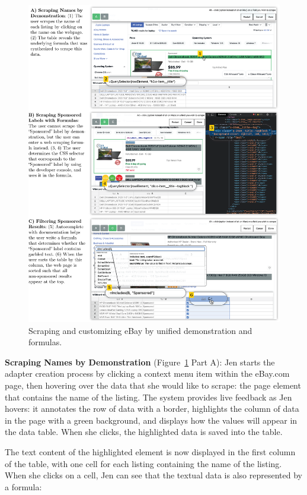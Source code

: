 \documentclass[sigconf,10pt]{acmart}
\begin{document}
\begin{figure}
  \includegraphics[width=\textwidth]{media/ebay.png}
  \caption{\label{fig:ebay}Scraping and customizing eBay by unified demonstration and formulas.}
\end{figure}

\textbf{Scraping Names by Demonstration} (Figure~\ref{fig:ebay} Part A):
Jen starts the adapter creation process by clicking a context menu item
within the eBay.com page, then hovering over the data that she would
like to scrape: the page element that contains the name of the listing.
The system provides live feedback as Jen hovers: it annotates the row of
data with a border, highlights the column of data in the page with a
green background, and displays how the values will appear in the data
table. When she clicks, the highlighted data is saved into the table.

The text content of the highlighted element is now displayed in the
first column of the table, with one cell for each listing containing the
name of the listing. When she clicks on a cell, Jen can see that the
textual data is also represented by a formula:
\end{document}
